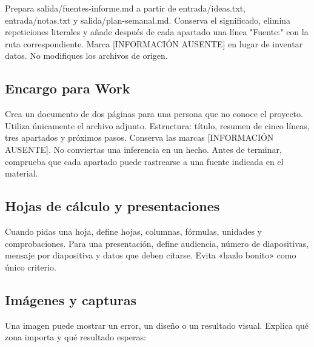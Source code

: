 \documentclass[10pt,a4paper,openany]{book}
\newenvironment{Shaded}{}{}
\newcommand{\NormalTok}[1]{#1}
\renewenvironment{Shaded}
  {\begin{tcolorbox}[
    enhanced,
    breakable,
    colback=CodeBg,
    colframe=Border,
    boxrule=0.5pt,
    arc=2mm,
    left=3mm,
    right=3mm,
    top=2.2mm,
    bottom=2.2mm,
    before skip=0.8em,
    after skip=0.9em
  ]}
  {\end{tcolorbox}}
\begin{document}
\begin{Shaded}
\begin{Highlighting}[]
\NormalTok{Prepara salida/fuentes{-}informe.md a partir de entrada/ideas.txt,}
\NormalTok{entrada/notas.txt y salida/plan{-}semanal.md. Conserva el significado, elimina}
\NormalTok{repeticiones literales y añade después de cada apartado una línea "Fuente:" con}
\NormalTok{la ruta correspondiente. Marca [INFORMACIÓN AUSENTE] en lugar de inventar datos.}
\NormalTok{No modifiques los archivos de origen.}
\end{Highlighting}
\end{Shaded}

\subsection{Encargo para Work}\label{encargo-para-work}

\begin{Shaded}
\begin{Highlighting}[]
\NormalTok{Crea un documento de dos páginas para una persona que no conoce el proyecto.}
\NormalTok{Utiliza únicamente el archivo adjunto. Estructura: título, resumen de cinco líneas,}
\NormalTok{tres apartados y próximos pasos. Conserva las marcas [INFORMACIÓN AUSENTE].}
\NormalTok{No conviertas una inferencia en un hecho. Antes de terminar, comprueba que cada}
\NormalTok{apartado puede rastrearse a una fuente indicada en el material.}
\end{Highlighting}
\end{Shaded}

\subsection{Hojas de cálculo y
presentaciones}\label{hojas-de-cuxe1lculo-y-presentaciones}

Cuando pidas una hoja, define hojas, columnas, fórmulas, unidades y
comprobaciones. Para una presentación, define audiencia, número de
diapositivas, mensaje por diapositiva y datos que deben citarse. Evita
«hazlo bonito» como único criterio.

\subsection{Imágenes y capturas}\label{imuxe1genes-y-capturas}

Una imagen puede mostrar un error, un diseño o un resultado visual.
Explica qué zona importa y qué resultado esperas:
\end{document}
